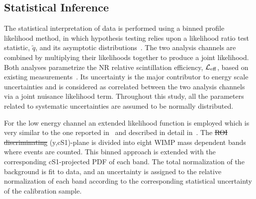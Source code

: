 
\subsection{Statistical Inference}
\label{sec:LikelihoodFunction}
The statistical interpretation of data is performed using a binned profile likelihood method, in which hypothesis testing relies upon a likelihood ratio test statistic, $\tilde{q}$, 
and its asymptotic distributions~\cite{asympt}. The two analysis channels are combined by multiplying their likelihoods together to produce a joint likelihood. 
Both analyses parametrize the NR relative scintillation efficiency, $\mathcal{L}_{\mathrm{eff}}$, based on existing measurements~\cite{run8Result}. Its uncertainty is the major contributor to energy scale uncertainties and is considered as correlated between the two analysis channels via a joint nuisance likelihood term.
Throughout this study, all the parameters related to systematic uncertainties are assumed to be normally distributed.

For the low energy channel an extended likelihood function is employed which is very similar to the one reported in~\cite{Aprile:2011hx} and described in detail in~\cite{xe100_run_combination}. 
The \sout{ROI discriminating} (y,cS1)-plane is divided into eight WIMP mass dependent bands where events are counted. This binned approach is extended with the corresponding cS1-projected PDF of each band. The total normalization of the background is fit to data, and an uncertainty is assigned to the relative normalization of each band according to the corresponding statistical uncertainty of the calibration sample.

